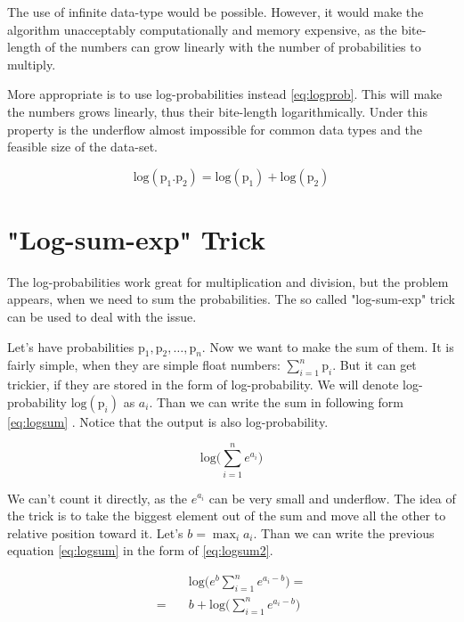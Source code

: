 \documentclass[thesis=M,english]{FITthesis}[2012/10/20]
\begin{document}
The use of infinite data-type would be possible. However, it would make the algorithm unacceptably computationally and memory expensive, as the bite-length of the numbers can grow linearly with the number of probabilities to multiply.

More appropriate is to use log-probabilities instead \eqref{eq:logprob}. This will make the numbers grows linearly, thus their bite-length logarithmically. Under this property is the underflow almost impossible for common data types and the feasible size of the data-set.

\begin{equation}\label{eq:logprob}
\mathrm{log}(\mathrm{p}_1.\mathrm{p}_2) = \mathrm{log}(\mathrm{p}_1) + \mathrm{log}(\mathrm{p}_2)
\end{equation}   

\section{"Log-sum-exp" Trick}

The log-probabilities work great for multiplication and division, but the problem appears, when we need to sum the probabilities. The so called "log-sum-exp" trick can be used to deal with the issue.

Let's have probabilities $ \mathrm{p}_1, \mathrm{p}_2, \dots ,\mathrm{p}_n $. Now we want to make the sum of them. It is fairly simple, when they are simple float numbers: $\sum_{i=1}^n \mathrm{p}_i$. But it can get trickier, if they are stored in the form of log-probability. We will denote log-probability $\mathrm{log}( \mathrm{p}_i )$ as $a_i$. Than we can write the sum in following form \eqref{eq:logsum} . Notice that the output is also log-probability.

\begin{equation}\label{eq:logsum}
\mathrm{log} \big( \sum_{i=1}^n e^{a_i} \big)
\end{equation}

We can't count it directly, as the $e^{a_i}$ can be very small and underflow. The idea of the trick is to take the biggest element out of the sum and move all the other to relative position toward it.
Let's $b = \max_{i} a_i$. Than we can write the previous equation \eqref{eq:logsum} in the form of \eqref{eq:logsum2}. 

\begin{equation}\label{eq:logsum2}
\begin{aligned}
&\mathrm{log} \big( e^b \sum_{i=1}^n e^{a_i - b } \big) = \\
 = \quad &  b + \mathrm{log} \big( \sum_{i=1}^n e^{a_i - b } \big)
\end{aligned}
\end{equation}
\end{document}
